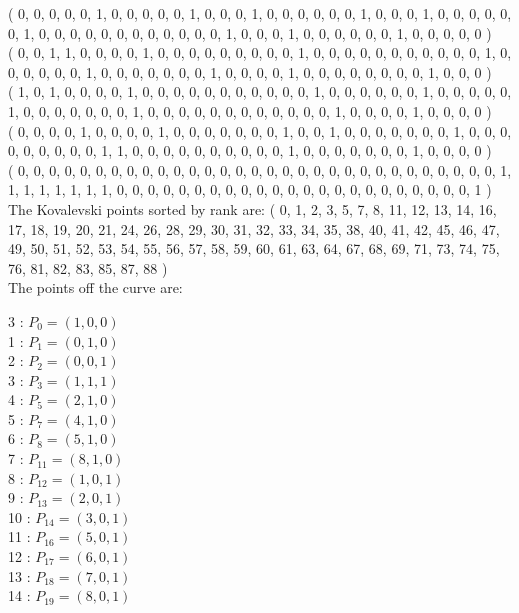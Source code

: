 \documentclass{article}
\begin{document}
{( 0, 0, 0, 0, 0, 1, 0, 0, 0, 0, 0, 1, 0, 0, 0, 1, 0, 0, 0, 0, 0, 0, 1, 0, 0, 0, 1, 0, 0, 0, 0, 0, 0, 1, 0, 0, 0, 0, 0, 0, 0, 0, 0, 0, 0, 0, 1, 0, 0, 0, 1, 0, 0, 0, 0, 0, 0, 1, 0, 0, 0, 0, 0 )\\
( 0, 0, 1, 1, 0, 0, 0, 0, 1, 0, 0, 0, 0, 0, 0, 0, 0, 0, 1, 0, 0, 0, 0, 0, 0, 0, 0, 0, 0, 0, 1, 0, 0, 0, 0, 0, 0, 1, 0, 0, 0, 0, 0, 0, 0, 1, 0, 0, 0, 0, 1, 0, 0, 0, 0, 0, 0, 0, 0, 1, 0, 0, 0 )\\
( 1, 0, 1, 0, 0, 0, 0, 1, 0, 0, 0, 0, 0, 0, 0, 0, 0, 0, 0, 1, 0, 0, 0, 0, 0, 0, 1, 0, 0, 0, 0, 0, 1, 0, 0, 0, 0, 0, 0, 0, 1, 0, 0, 0, 0, 0, 0, 0, 0, 0, 0, 0, 0, 1, 0, 0, 0, 0, 1, 0, 0, 0, 0 )\\
( 0, 0, 0, 0, 1, 0, 0, 0, 0, 1, 0, 0, 0, 0, 0, 0, 0, 1, 0, 0, 1, 0, 0, 0, 0, 0, 0, 0, 1, 0, 0, 0, 0, 0, 0, 0, 0, 0, 1, 1, 0, 0, 0, 0, 0, 0, 0, 0, 0, 0, 1, 0, 0, 0, 0, 0, 0, 0, 1, 0, 0, 0, 0 )\\
( 0, 0, 0, 0, 0, 0, 0, 0, 0, 0, 0, 0, 0, 0, 0, 0, 0, 0, 0, 0, 0, 0, 0, 0, 0, 0, 0, 0, 0, 0, 0, 1, 1, 1, 1, 1, 1, 1, 1, 0, 0, 0, 0, 0, 0, 0, 0, 0, 0, 0, 0, 0, 0, 0, 0, 0, 0, 0, 0, 0, 0, 0, 1 )\\
The Kovalevski points sorted by rank are: 
( 0, 1, 2, 3, 5, 7, 8, 11, 12, 13, 14, 16, 17, 18, 19, 20, 21, 24, 26, 28, 29, 30, 31, 32, 33, 34, 35, 38, 40, 41, 42, 45, 46, 47, 49, 50, 51, 52, 53, 54, 55, 56, 57, 58, 59, 60, 61, 63, 64, 67, 68, 69, 71, 73, 74, 75, 76, 81, 82, 83, 85, 87, 88 )\\
The points off the curve are: \\
\begin{multicols}{3}
 : $P_{0}=( 1, 0, 0 )$\\
1 : $P_{1}=( 0, 1, 0 )$\\
2 : $P_{2}=( 0, 0, 1 )$\\
3 : $P_{3}=( 1, 1, 1 )$\\
4 : $P_{5}=( 2, 1, 0 )$\\
5 : $P_{7}=( 4, 1, 0 )$\\
6 : $P_{8}=( 5, 1, 0 )$\\
7 : $P_{11}=( 8, 1, 0 )$\\
8 : $P_{12}=( 1, 0, 1 )$\\
9 : $P_{13}=( 2, 0, 1 )$\\
10 : $P_{14}=( 3, 0, 1 )$\\
11 : $P_{16}=( 5, 0, 1 )$\\
12 : $P_{17}=( 6, 0, 1 )$\\
13 : $P_{18}=( 7, 0, 1 )$\\
14 : $P_{19}=( 8, 0, 1 )$\\

\end{multicols}}
\end{document}
